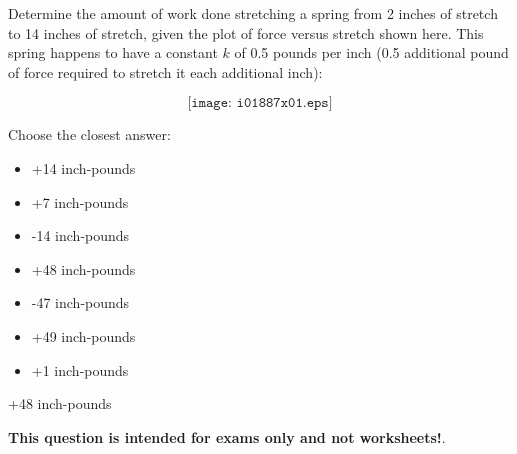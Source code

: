 

Determine the amount of work done stretching a spring from 2 inches of stretch to 14 inches of stretch, given the plot of force versus stretch shown here.  This spring happens to have a constant $k$ of 0.5 pounds per inch (0.5 additional pound of force required to stretch it each additional inch):

$$\texttt{[image: i01887x01.eps]}$$

Choose the closest answer:

\begin{itemize}
\item{} +14 inch-pounds
\vskip 10pt 
\item{} +7 inch-pounds
\vskip 10pt 
\item{} -14 inch-pounds
\vskip 10pt 
\item{} +48 inch-pounds
\vskip 10pt 
\item{} -47 inch-pounds
\vskip 10pt 
\item{} +49 inch-pounds
\vskip 10pt 
\item{} +1 inch-pounds
\end{itemize}







+48 inch-pounds






{\bf This question is intended for exams only and not worksheets!}.



